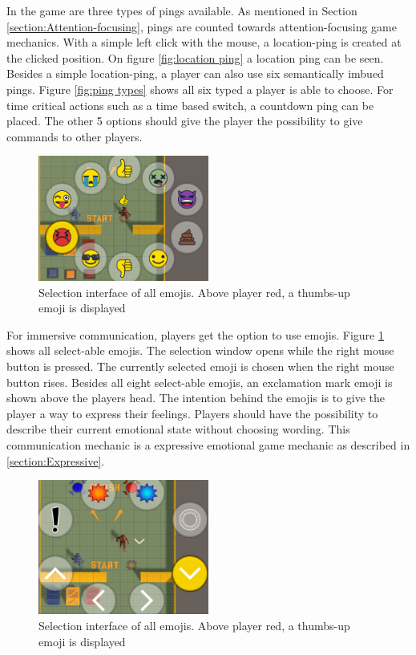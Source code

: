 In the game are three types of pings available. As mentioned in
Section \ref{section:Attention-focusing}, pings are counted towards attention-focusing game mechanics. With a simple left click with the mouse, a location-ping is created at the clicked position. On figure \ref{fig:location ping} a location ping can be seen.
Besides a simple location-ping, a player can also use six semantically imbued pings. Figure \ref{fig:ping types} shows all six typed a player is able to choose. For time critical actions such as a time based switch, a countdown ping can be placed. The other 5 options should give the player the possibility to give commands to other players. 


\begin{figure}
    \centering
    \includegraphics[width=0.5\textwidth]{images/emoji_selection.png}
    \caption{Selection interface of all emojis. Above player red, a thumbs-up emoji is displayed}
    \label{fig:emoji selection}
\end{figure}

For immersive communication, players get the option to use emojis.
Figure \ref{fig:emoji selection} shows all select-able emojis. The selection window opens while the right mouse button is pressed. The currently selected emoji is chosen when the right mouse button rises.
Besides all eight select-able emojis, an exclamation mark emoji is shown above the players head. The intention behind the emojis is to give the player a way to express their feelings. Players should have the possibility to describe their current emotional state without choosing wording. This communication mechanic is a expressive emotional game mechanic as described in \ref{section:Expressive}.


\begin{figure}
    \centering
    \includegraphics[width=0.5\textwidth]{images/decal_selection.png}
    \caption{Selection interface of all emojis. Above player red, a thumbs-up emoji is displayed}
    \label{fig:decal selection}
\end{figure}

